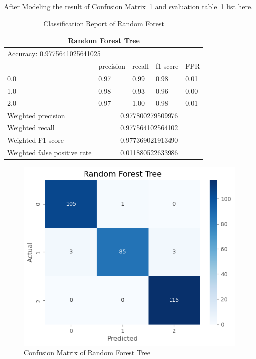 After Modeling the result of Confusion Matrix~\ref*{cmRFT} and evaluation table~\ref*{tableRFT} list here.


\begin{table}[H]  \centering  
    \begin{tabular}{@{}lllll@{}}
    \toprule
    \multicolumn{5}{c}{Random Forest Tree}                 \\ \midrule
    \multicolumn{5}{l}{Accuracy: 0.9775641025641025}       \\\midrule
                 & precision & recall & f1-score & FPR \\
    0.0         & 0.97      & 0.99   & 0.98     & 0.01      \\ 
    1.0          & 0.98      & 0.93   & 0.96     & 0.00     \\
    2.0       & 0.97      & 1.00   & 0.98     & 0.01     \\
    
    Weighted precision    & \multicolumn{4}{c}{0.977800279509976}         \\
    Weighted recall    & \multicolumn{4}{c}{0.977564102564102}          \\
    Weighted F1 score    & \multicolumn{4}{c}{0.977369021913490}        \\
    Weighted false positive rate & \multicolumn{4}{c}{0.011880522633986}         \\ \bottomrule
    \end{tabular}
    \caption{Classification Report of Random Forest}
    \label{tableRFT}
\end{table}





\begin{figure}[H]
    \includegraphics[scale=0.7]{imgs/rft}
    \centering
    \caption{Confusion Matrix of Random Forest Tree}
    \label{cmRFT}
\end{figure}



